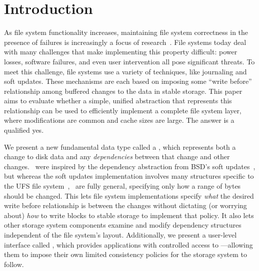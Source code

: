 
\section {Introduction}
\label{sec:intro}

\begin{comment}
This paper aims to evaluate whether a simple, unified abstraction that
represents all modifications to stable storage, including
\emph{dependencies} among modifications, can be used to efficiently
implement a complete file system layer, where modifications are common
and cache sizes are large.
%
The answer is a qualified yes.
\end{comment}


As file system functionality increases, maintaining file system
 correctness in the presence of failures is increasingly a focus of
 research~\cite{sivathanuetal05-logic,denehyetal05-journal-guided}.
%
File systems today deal with many challenges that make implementing this
 property difficult: power losses, software failures, and even user
 intervention all pose significant threats.
%
To meet this challenge, file systems use a variety of techniques, like
 journaling and soft updates.
%
These mechanisms are each based on imposing some ``write before''
 relationship among buffered changes to the data in stable storage.
%
This paper aims to evaluate whether a simple, unified abstraction that
 represents this relationship can be used to efficiently implement a
 complete file system layer, where modifications are common and cache
 sizes are large.
%
The answer is a qualified yes.


We present a new fundamental data type called a \emph{\patch},
 which represents both a change to disk data and any \emph{dependencies}
 between that change and other changes. 
%
\Patches\ were inspired by the dependency abstraction from BSD's soft
 updates~\cite{ganger00soft}, but whereas the soft updates implementation
 involves many structures specific to the UFS file
 system~\cite{mckusick99soft}, \patches\ are fully general,
 specifying only how a range of bytes should be changed.
%
This lets file system implementations specify \emph{what} the desired
 write before relationship is between the changes without dictating (or
 worrying about) \emph{how} to write blocks to stable storage to implement
 that policy.
%
It also lets other storage system components examine and
 modify dependency structures independent of the file system's layout.
%
Additionally, we present a user-level interface called \patchgroups,
 which provides applications with controlled access to \patches---allowing
 them to impose their own limited consistency policies for the storage
 system to follow.


